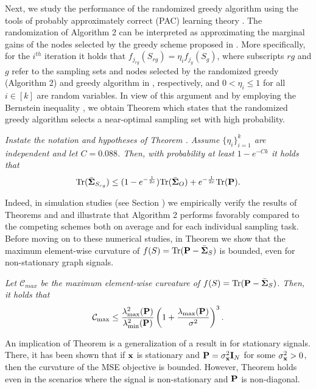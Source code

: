 Next, we study the performance of the randomized greedy algorithm using the tools of probably approximately correct (PAC) learning theory \cite{valiant1984theory,valiant2013probably}. The randomization of Algorithm 2 can be interpreted as approximating the marginal gains of the nodes selected by the greedy scheme proposed in \cite{chamon2017greedy}. More specifically, for the $i^{th}$ iteration it holds that $f_{j_{rg}}(S_{rg}) = \eta_i f_{j_{g}}(S_{g})$, where subscripts $rg$ and $g$ refer to the sampling sets and nodes selected by the randomized greedy (Algorithm 2) and greedy algorithm in \cite{chamon2017greedy}, respectively, and $0<\eta_i\leq 1$ for all $i \in [k]$ are random variables. 
In view of this argument and by employing the Bernstein inequality \cite{tropp2015introduction}, we obtain 
Theorem  which states that the randomized greedy algorithm selects a near-optimal sampling 
set with high probability.
%
\begin{theorem}\label{thm:pac}
\textit{Instate the notation and hypotheses of Theorem . Assume $\{\eta_i\}_{i=1}^k$ are independent and let $C=0.088$. Then, with probability at least $1-e^{-Ck}$ it holds that}
%
\begin{equation}\label{eq:pacbound}
\mathrm{Tr}(\bar{\S}_{S_{rg}})\leq (1-e^{-\frac{1}{2c}}) \mathrm{Tr}(\bar{\S}_{O}) + e^{-\frac{1}{2c}} \mathrm{Tr}(\P).
\end{equation}
%
\end{theorem}
%
Indeed, in simulation studies (see Section ) we empirically verify the results of Theorems  and  and illustrate that Algorithm 2 performs favorably compared to the competing schemes both on average and for each individual sampling task. Before moving on to these numerical studies, 
in Theorem  we show that the maximum element-wise curvature of $f(S) = \mathrm{Tr}(\P-\bar{\S}_S)$ is bounded, even for non-stationary graph signals. 
%
\begin{theorem}\label{thm:curv}
\textit{Let $\mathcal{C}_{max}$ be the maximum element-wise curvature of $f(S) = \mathrm{Tr}(\P-\bar{\S}_S)$. Then, it holds that}
\begin{equation}\label{eq:curvbound}
\mathcal{C}_{\max} \leq \frac{\lambda_{\max}^2(\P)}{\lambda_{\min}^2(\P)}\left(1+\frac{\lambda_{\max}(\P)}{\sigma^2}\right)^3.
\end{equation}
\end{theorem}
An implication of Theorem  is a generalization of a result in \cite{chamon2017greedy} for stationary signals. There, it has been shown that if $\x$ is stationary and $\P = \sigma_\x^2\I_N$ for some $\sigma_\x^2>0$, then the curvature of the MSE objective is bounded. However, Theorem  holds even in the scenarios where the signal is non-stationary and $\P$ is non-diagonal.